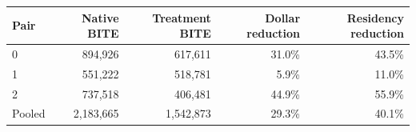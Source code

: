 \begin{tabular}{lrrrr}
\toprule
Pair & Native BITE & Treatment BITE & Dollar reduction & Residency reduction \\
\midrule
0 & 894,926 & 617,611 & 31.0\% & 43.5\% \\
1 & 551,222 & 518,781 & 5.9\% & 11.0\% \\
2 & 737,518 & 406,481 & 44.9\% & 55.9\% \\
\midrule
Pooled & 2,183,665 & 1,542,873 & 29.3\% & 40.1\% \\
\bottomrule
\end{tabular}
